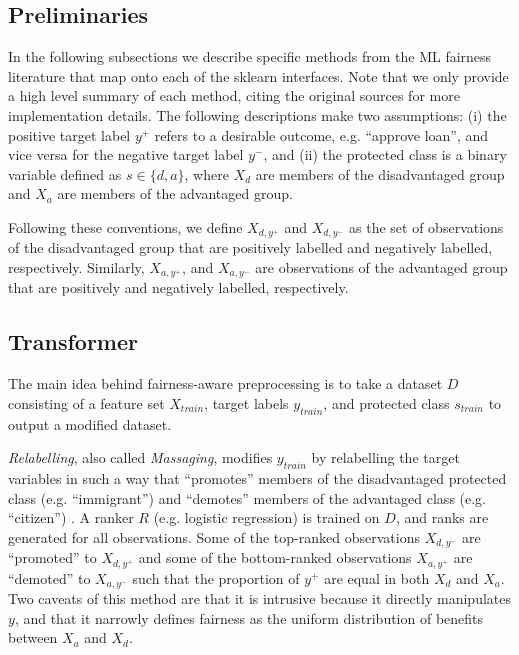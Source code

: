 \documentclass{acm_proc_article-sp}
\begin{document}
\subsection{Preliminaries} In the following subsections we describe specific
methods from the ML fairness literature that map onto each of the sklearn
interfaces. Note that we only provide a high level summary of each method,
citing the original sources for more implementation details. The following
descriptions make two assumptions: (i) the positive target label \(y^{+}\)
refers to a desirable outcome, e.g. ``approve loan'', and vice versa for the
negative target label \(y^{-}\), and (ii) the protected class is a binary
variable defined as \(s \in \{d, a\}\), where \(X_d\)  are members of the
disadvantaged group and \(X_a\) are members of the advantaged group.

Following these conventions, we define \(X_{d, y^{+}}\) and \(X_{d, y^{-}}\)
as the set of observations of the disadvantaged group that are positively
labelled and negatively labelled, respectively. Similarly, \(X_{a, y^{+}}\), and
\(X_{a, y^{-}}\)  are observations of the advantaged group that are positively
and negatively labelled, respectively.

\subsection{Transformer} The main idea behind fairness-aware preprocessing is to
take a dataset \(D\) consisting of a feature set \(X_{train}\), target labels
\(y_{train}\), and protected class \(s_{train}\) to output a modified dataset.

\emph{Relabelling}, also called \emph{Massaging}, modifies \(y_{train}\) by relabelling
the target variables in such a way that ``promotes'' members of the
disadvantaged protected class (e.g. ``immigrant'') and ``demotes'' members of
the advantaged class (e.g. ``citizen'') \cite{kamiran2012data}. A ranker \(R\)
(e.g. logistic regression) is trained on \(D\), and ranks are generated for
all observations. Some of the top-ranked observations \(X_{d, y^{-}}\)  are
``promoted'' to \(X_{d, y^{+}}\) and some of the bottom-ranked observations
\(X_{a, y^{+}}\)  are ``demoted'' to \(X_{a, y^{-}}\) such that the proportion
of \(y^{+}\) are equal in both \(X_d\) and \(X_a\). Two caveats of this method
are that it is intrusive because it directly manipulates \(y\), and that it
narrowly defines fairness as the uniform distribution of benefits between
\(X_a\) and \(X_d\).
\end{document}
